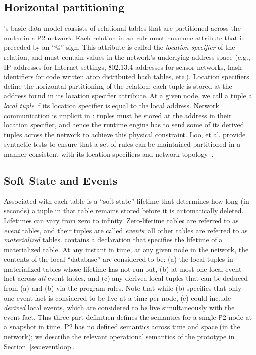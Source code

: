 \subsection{Horizontal partitioning}

\OVERLOG's basic data model consists of relational tables that are partitioned 
across the nodes in a P2 network. Each relation in an \OVERLOG rule must have 
one attribute that is preceded by an ``@'' sign.  This attribute is called the 
{\em location specifier} of the relation, and must contain values in the network's
underlying address space (e.g., IP addresses for Internet settings,
802.13.4 addresses for sensor networks, hash-identifiers for code
written atop distributed hash tables, etc.).  Location specifiers define
the horizontal partitioning of the relation: each tuple is stored at the
address found in its location specifier attribute.  At a given node, we
call a tuple a {\em local tuple} if its location specifier is equal to
the local address.  Network communication is implicit in \OVERLOG: tuples
must be stored at the address in their location specifier, and hence the
runtime engine has to send some of its derived tuples across the network
to achieve this physical constraint.  Loo, et al. provide syntactic tests to
ensure that a set of rules can be maintained partitioned in a manner
consistent with its location specifiers and network
topology~\cite{loo-sigmod06}.


\subsection{Soft State and Events}

Associated with each \OVERLOG table is a ``soft-state'' lifetime that determines 
how long (in seconds) a tuple in that table remains stored before it is automatically 
deleted.  Lifetimes can vary from zero to infinity.  Zero-lifetime tables are referred to as
{\em event} tables, and their tuples are called \emph{events}; all other
tables are referred to as {\em materialized} tables.  \OVERLOG contains a
 declaration that specifies the lifetime of a
materialized table.  At any instant in time, at any given node in the
network, the contents of the local \OVERLOG ``database'' are considered
to be: (a) the local tuples in materialized tables whose lifetime has
not run out, (b) at most one local event fact across {\em all} event
tables, and (c) any derived local tuples that can be deduced from (a)
and (b) via the program rules.  Note that while (b) specifies that only
one event fact is considered to be live at a time per node, (c) could
include {\em derived} local events, which are considered to be live
simultaneously with the event fact.  This three-part definition defines the semantics for a
single P2 node at a snapshot in time.  P2 has no defined semantics
across time and space (in the network); we describe the relevant operational
semantics of the prototype in Section~\ref{sec:eventloop}.
     
